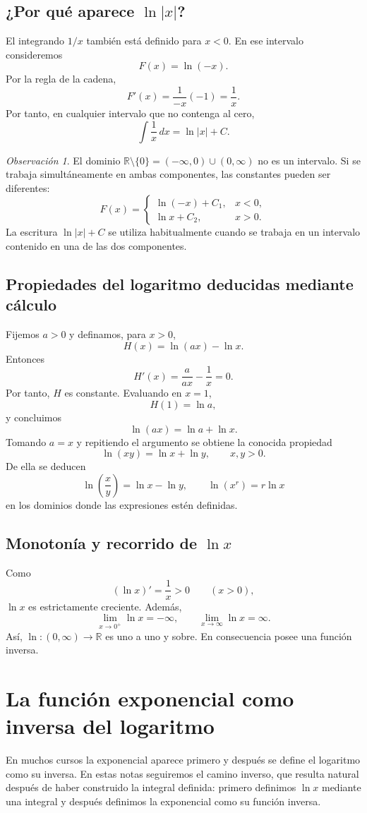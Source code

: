 \documentclass[12pt]{article}
\theoremstyle{definition}\newtheorem{definicion}[teorema]{Definición}\newtheorem{ejemplo}[teorema]{Ejemplo}\newtheorem{ejercicio}[teorema]{Ejercicio}
\theoremstyle{remark}\newtheorem*{observacion}{Observación}\newtheorem*{advertencia}{Advertencia}\newtheorem*{estrategia}{Estrategia}
\newcommand{\R}{\mathbb{R}}\newcommand{\dd}{\,dx}\newcommand{\du}{\,du}\newcommand{\dt}{\,dt}
\begin{document}
\subsection{¿Por qué aparece $\ln|x|$?}
El integrando $1/x$ también está definido para $x<0$. En ese intervalo consideremos
\[
F(x)=\ln(-x).
\]
Por la regla de la cadena,
\[
F'(x)=\frac{1}{-x}(-1)=\frac1x.
\]
Por tanto, en cualquier intervalo que no contenga al cero,
\[
\boxed{\int\frac1x\,dx=\ln|x|+C.}
\]
\begin{observacion}
El dominio $\R\setminus\{0\}=(-\infty,0)\cup(0,\infty)$ no es un intervalo. Si se trabaja simultáneamente en ambas componentes, las constantes pueden ser diferentes:
\[
F(x)=\begin{cases}
\ln(-x)+C_1,&x<0,\\[1mm]
\ln x+C_2,&x>0.
\end{cases}
\]
La escritura $\ln|x|+C$ se utiliza habitualmente cuando se trabaja en un intervalo contenido en una de las dos componentes.
\end{observacion}

\subsection{Propiedades del logaritmo deducidas mediante cálculo}
Fijemos $a>0$ y definamos, para $x>0$,
\[
H(x)=\ln(ax)-\ln x.
\]
Entonces
\[
H'(x)=\frac{a}{ax}-\frac1x=0.
\]
Por tanto, $H$ es constante. Evaluando en $x=1$,
\[
H(1)=\ln a,
\]
y concluimos
\[
\boxed{\ln(ax)=\ln a+\ln x.}
\]
Tomando $a=x$ y repitiendo el argumento se obtiene la conocida propiedad
\[
\boxed{\ln(xy)=\ln x+\ln y,\qquad x,y>0.}
\]
De ella se deducen
\[
\ln\left(\frac{x}{y}\right)=\ln x-\ln y,
\qquad
\ln(x^r)=r\ln x
\]
en los dominios donde las expresiones estén definidas.

\subsection{Monotonía y recorrido de $\ln x$}
Como
\[
(\ln x)'=\frac1x>0\qquad(x>0),
\]
$\ln x$ es estrictamente creciente. Además,
\[
\lim_{x\to0^+}\ln x=-\infty,
\qquad
\lim_{x\to\infty}\ln x=\infty.
\]
Así, $\ln:(0,\infty)\to\R$ es uno a uno y sobre. En consecuencia posee una función inversa.

\section{La función exponencial como inversa del logaritmo}
En muchos cursos la exponencial aparece primero y después se define el logaritmo como su inversa. En estas notas seguiremos el camino inverso, que resulta natural después de haber construido la integral definida: primero definimos $\ln x$ mediante una integral y después definimos la exponencial como su función inversa.
\end{document}
